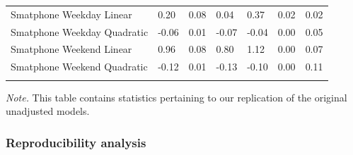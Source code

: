 \documentclass[floatsintext,man]{apa6}
\theoremstyle{definition}
\theoremstyle{definition}
\theoremstyle{definition}
\theoremstyle{remark}
\begin{document}
\begin{table}[tbp]
\begin{center}
\begin{threeparttable}
\begin{tabular}{lllllll}
Smatphone Weekday Linear & 0.20 & 0.08 & 0.04 & 0.37 & 0.02 & 0.02\\
Smatphone Weekday Quadratic & -0.06 & 0.01 & -0.07 & -0.04 & 0.00 & 0.05\\
Smatphone Weekend Linear & 0.96 & 0.08 & 0.80 & 1.12 & 0.00 & 0.07\\
Smatphone Weekend Quadratic & -0.12 & 0.01 & -0.13 & -0.10 & 0.00 & 0.11\\
\bottomrule
\addlinespace
\end{tabular}
\begin{tablenotes}[para]
\textit{Note.} This table contains statistics pertaining to our replication of the original unadjusted models.
\end{tablenotes}
\end{threeparttable}
\end{center}
\end{table}

\hypertarget{reproducibility-analysis}{%
\subsubsection{Reproducibility
analysis}\label{reproducibility-analysis}}
\end{document}
